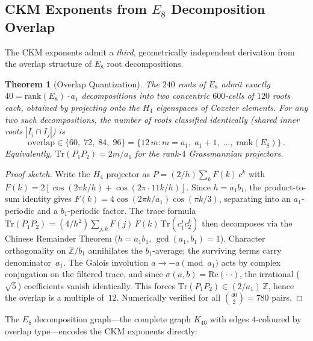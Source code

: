\documentclass[12pt,a4paper]{article}
\newtheorem{theorem}{Theorem}
\theoremstyle{definition}
\begin{document}
\subsection{CKM Exponents from $E_8$ Decomposition Overlap}
\label{sec:e8_overlap_ckm}

The CKM exponents admit a \emph{third}, geometrically independent derivation from the overlap structure of $E_8$ root decompositions.

\begin{theorem}[Overlap Quantization]
\label{thm:overlap_quant}
The $240$ roots of $E_8$ admit exactly $40 = \mathrm{rank}(E_8)\cdot a_1$ decompositions into two concentric $600$-cells of $120$ roots each, obtained by projecting onto the $H_4$ eigenspaces of Coxeter elements.  For any two such decompositions, the number of roots classified identically (shared inner roots $|I_i \cap I_j|$) is
\begin{equation}
\boxed{\mathrm{overlap} \in \{60,\; 72,\; 84,\; 96\} = \bigl\{12\,m : m = a_1,\; a_1\!+\!1,\; \ldots,\; \mathrm{rank}(E_8)\bigr\}}\,.
\label{eq:overlap_quant}
\end{equation}
Equivalently, $\mathrm{Tr}(P_1 P_2) = 2m/a_1$ for the rank-$4$ Grassmannian projectors.
\end{theorem}

\begin{proof}[Proof sketch]
Write the $H_4$ projector as $P = (2/h)\sum_k F(k)\,c^k$ with $F(k) = 2[\cos(2\pi k/h) + \cos(2\pi\cdot 11k/h)]$.  Since $h = a_1 b_1$, the product-to-sum identity gives $F(k) = 4\cos(2\pi k/a_1)\cos(\pi k/3)$, separating into an $a_1$-periodic and a $b_1$-periodic factor.  The trace formula $\mathrm{Tr}(P_1 P_2) = (4/h^2)\sum_{j,k} F(j)\,F(k)\,\mathrm{Tr}(c_1^j c_2^k)$ then decomposes via the Chinese Remainder Theorem ($h = a_1 b_1$, $\gcd(a_1,b_1) = 1$).  Character orthogonality on $\mathbb{Z}/b_1$ annihilates the $b_1$-average; the surviving terms carry denominator~$a_1$.  The Galois involution $a \to -a\!\pmod{a_1}$ acts by complex conjugation on the filtered trace, and since $\sigma(a,b) = \mathrm{Re}(\cdots)$, the irrational ($\sqrt{5}$) coefficients vanish identically.  This forces $\mathrm{Tr}(P_1 P_2) \in (2/a_1)\,\mathbb{Z}$, hence the overlap is a multiple of~$12$.  Numerically verified for all $\binom{40}{2} = 780$ pairs.
\end{proof}

\noindent The $E_8$ decomposition graph---the complete graph $K_{40}$ with edges $4$-coloured by overlap type---encodes the CKM exponents directly:
\end{document}
